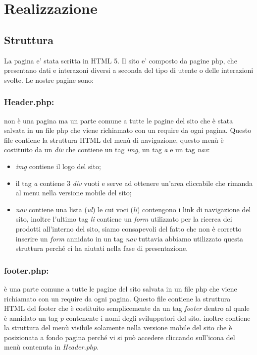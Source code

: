\section{Realizzazione}
\subsection{Struttura}
La pagina e' stata scritta in HTML 5.\newline
Il sito e' composto da pagine php, che presentano dati e interazoni diversi a seconda del tipo di utente o delle interazioni svolte.
Le nostre pagine sono:

	
 \subsubsection{Header.php:}\Spazio non è una pagina ma un parte comune a tutte le pagine del sito che è stata salvata in un file php che viene richiamato con un require da ogni pagina. Questo file contiene la struttura HTML del menù di navigazione, questo menù è costituito da un \emph{div} che contiene un tag \emph{img}, un tag \emph{a} e un tag \emph{nav}:
 \begin{itemize}
 	\item \emph{img} contiene il logo del sito;
 	\item il tag \emph{a} contiene 3 \emph{div} vuoti e serve ad ottenere un'area cliccabile che rimanda al menu nella versione mobile del sito; 
 	\item \emph{nav} contiene una lista (\emph{ul}) le cui voci (\emph{li}) contengono i link di navigazione del sito, inoltre l'ultimo tag \emph{li} contiene un \emph{form} utilizzato per la ricerca dei prodotti all'interno del sito, siamo consapevoli del fatto che non è corretto inserire un \emph{form} annidato in un tag \emph{nav} tuttavia abbiamo utilizzato questa struttura perché ci ha aiutati nella fase di presentazione.
 	
 \end{itemize}


 \subsubsection{footer.php:} \Spazio è una parte comune a tutte le pagine del sito salvata in un file php che viene richiamato con un require da ogni pagina.
 Questo file contiene la struttura HTML del footer che è costituito semplicemente da un tag \emph{footer} dentro al quale è annidato un tag \emph{p} contenente i nomi degli sviluppatori del sito. 
 inoltre contiene la struttura del menù visibile solamente nella versione mobile del sito che è posizionata a fondo pagina perché vi si può accedere cliccando sull'icona del menù contenuta in \emph{Header.php}.
	
